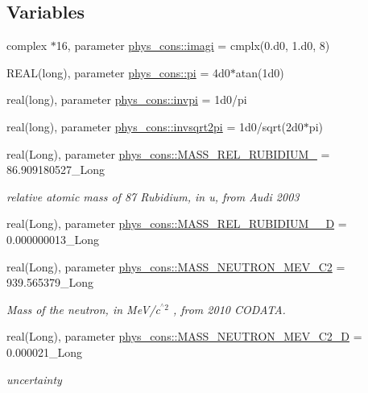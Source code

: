 \subsection*{Variables}
\begin{DoxyCompactItemize}
\item 
complex $\ast$16, parameter \hyperlink{namespacephys__cons_a0dbb22856790b16e206de451e9cdd74a}{phys\_\-cons::imagi} = cmplx(0.d0, 1.d0, 8)
\item 
REAL(long), parameter \hyperlink{namespacephys__cons_aae3c6cb8ae765b0262bb110ff739ba9d}{phys\_\-cons::pi} = 4d0$\ast$atan(1d0)
\item 
real(long), parameter \hyperlink{namespacephys__cons_aa8683f00f4216acc1822dfcb85b1ee00}{phys\_\-cons::invpi} = 1d0/pi
\item 
real(long), parameter \hyperlink{namespacephys__cons_a369d33713444a99a71f80a74c0652d4e}{phys\_\-cons::invsqrt2pi} = 1d0/sqrt(2d0$\ast$pi)
\item 
real(Long), parameter \hyperlink{namespacephys__cons_a41d46c36bfd57d8d6d1721791aa48ae2}{phys\_\-cons::MASS\_\-REL\_\-RUBIDIUM\_} = 86.909180527\_\-Long
\begin{DoxyCompactList}\small\item\em relative atomic mass of 87 Rubidium, in u, from Audi 2003 \item\end{DoxyCompactList}\item 
real(Long), parameter \hyperlink{namespacephys__cons_afb707c156dff06d8cfcf41488ce7aeda}{phys\_\-cons::MASS\_\-REL\_\-RUBIDIUM\_\_\-D} = 0.000000013\_\-Long
\item 
real(Long), parameter \hyperlink{namespacephys__cons_a9e80f5448f5f42cf9983890809e55d88}{phys\_\-cons::MASS\_\-NEUTRON\_\-MEV\_\-C2} = 939.565379\_\-Long
\begin{DoxyCompactList}\small\item\em Mass of the neutron, in MeV/c$^{\mbox{$^\wedge$2}}$ , from 2010 CODATA. \item\end{DoxyCompactList}\item 
real(Long), parameter \hyperlink{namespacephys__cons_ab5fb46dc243eb307a344a134a593edd0}{phys\_\-cons::MASS\_\-NEUTRON\_\-MEV\_\-C2\_\-D} = 0.000021\_\-Long
\begin{DoxyCompactList}\small\item\em uncertainty \item\end{DoxyCompactList}\item 

\end{DoxyCompactItemize}
